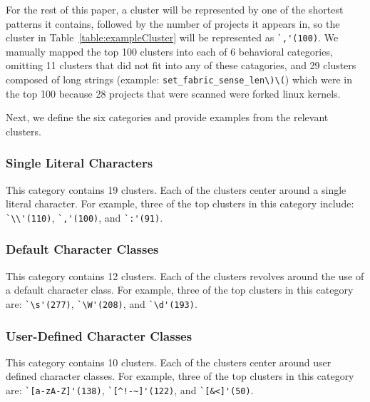 For the rest of this paper, a cluster will be represented by one of the shortest patterns it contains, followed by the number of projects it appears in, so the cluster in Table~\ref{table:exampleCluster} will be represented as \verb!`,'(100)!.
We  manually mapped the top 100 clusters into each of 6 behavioral categories, omitting 11 clusters that did not fit into any of these catagories, and 29 clusters composed of long strings (example: \verb!set_fabric_sense_len\)\(!) which were in the top 100 because 28 projects that were scanned were forked linux kernels.


Next, we define the six categories and provide examples from the relevant clusters.

\subsubsection{Single Literal Characters}
This category contains 19 clusters. Each of the clusters center around a single literal character. For example, three of the top clusters in this category include:
\verb!`\\'(110)!, \verb!`,'(100)!, and \verb!`:'(91)!.

\subsubsection{Default Character Classes}
This category contains 12 clusters. Each of the clusters revolves around the use of a default character class. For example, three of the top clusters in this category are:
\verb!`\s'(277)!, \verb!`\W'(208)!, and \verb!`\d'(193)!.

\subsubsection{User-Defined Character Classes}
This category contains 10 clusters. Each of the clusters center around user defined character classes. For example, three of the top clusters in this category are:
\verb!`[a-zA-Z]'(138)!, \verb•`[^!-~]'(122)•, and \verb!`[&<]'(50)!.


